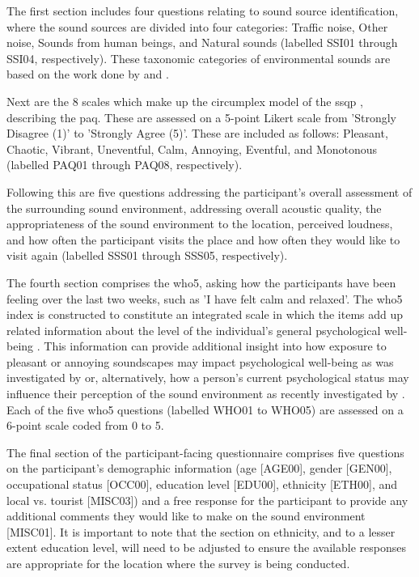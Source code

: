    The first section includes four questions relating to sound source identification, where the sound sources are divided into four categories: Traffic noise, Other noise, Sounds from human beings, and Natural sounds (labelled SSI01 through SSI04, respectively). These taxonomic categories of environmental sounds are based on the work done by \citet{Guastavino2005Ecological} and \citet{Brown2018study} .

   Next are the 8 scales which make up the circumplex model of the \gls{ssqp} \citep{Axelsson2012Swedish}, describing the \gls{paq}. These are assessed on a 5-point Likert scale from 'Strongly Disagree (1)' to 'Strongly Agree (5)'. These are included as follows: Pleasant, Chaotic, Vibrant, Uneventful, Calm, Annoying, Eventful, and Monotonous (labelled PAQ01 through PAQ08, respectively).

   Following this are five questions addressing the participant's overall assessment of the surrounding sound environment, addressing overall acoustic quality, the appropriateness of the sound environment to the location, perceived loudness, and how often the participant visits the place and how often they would like to visit again (labelled SSS01 through SSS05, respectively).

   The fourth section comprises the \gls{who5}, asking how the participants have been feeling over the last two weeks, such as 'I have felt calm and relaxed'. The \gls{who5} index is constructed to constitute an integrated scale in which the items add up related information about the level of the individual's general psychological well-being . This information can provide additional insight into how exposure to pleasant or annoying soundscapes may impact psychological well-being as was investigated by \citet{Aletta2019Associations}  or, alternatively, how a person's current psychological status may influence their perception of the sound environment as recently investigated by \citet{Erfanian2021Psychological}. Each of the five \gls{who5} questions (labelled WHO01 to WHO05) are assessed on a 6-point scale coded from 0 to 5.


   The final section of the participant-facing questionnaire comprises five questions on the participant's demographic information (age [AGE00], gender [GEN00], occupational status [OCC00], education level [EDU00], ethnicity [ETH00], and local vs. tourist [MISC03]) and a free response for the participant to provide any additional comments they would like to make on the sound environment [MISC01]. It is important to note that the section on ethnicity, and to a lesser extent education level, will need to be adjusted to ensure the available responses are appropriate for the location where the survey is being conducted.

